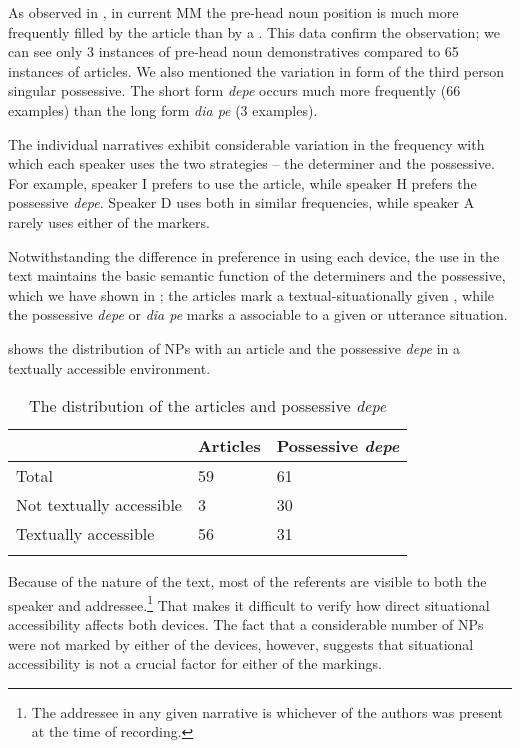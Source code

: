 \documentclass[output=paper
,modfonts
,nonflat]{langsci/langscibook}
\begin{document}
\noindent
As observed in , in current MM the pre-head noun position is much more frequently filled by the article than by a . This data confirm the observation; we can see only 3 instances of pre-head noun demonstratives compared to 65 instances of articles. We also mentioned the variation in form of the third person singular possessive. The short form \textit{depe} occurs much more frequently (66 examples) than the long form \textit{dia pe} (3 examples).

The individual narratives exhibit considerable variation in the frequency with which each speaker uses the two strategies – the determiner and the possessive. For example, speaker I prefers to use the article, while speaker H prefers the possessive \textit{depe}. Speaker D uses both in similar frequencies, while speaker A rarely uses either of the markers.

Notwithstanding the difference in preference in using each device, the use in the text maintains the basic semantic function of the determiners and the possessive, which we have shown in ; the articles mark a textual-situationally given , while the possessive \textit{depe} or \textit{dia pe} marks a  associable to a given  or utterance situation.

 shows the distribution of NPs with an article and the possessive \textit{depe} in a textually accessible environment.

\begin{table}
	\begin{tabularx}{.8\textwidth}{Xll}
		\lsptoprule
		& Articles & Possessive \textit{depe}\\
		\midrule
		Total & 59 & 61\\
		Not textually accessible & 3 & 30\\
		Textually accessible & 56 & 31\\
		\lspbottomrule
	\end{tabularx}
	\caption{The distribution of the articles and possessive \textit{depe}}
	\label{tab:6}
\end{table}

\noindent
Because of the nature of the text, most of the referents are visible to both the speaker and addressee.\footnote{The addressee in any given narrative is whichever of the authors was present at the time of recording.} That makes it difficult to verify how direct situational accessibility affects both devices. The fact that a considerable number of NPs were not marked by either of the devices, however, suggests that situational accessibility is not a crucial factor for either of the markings.\largerpage
\end{document}
